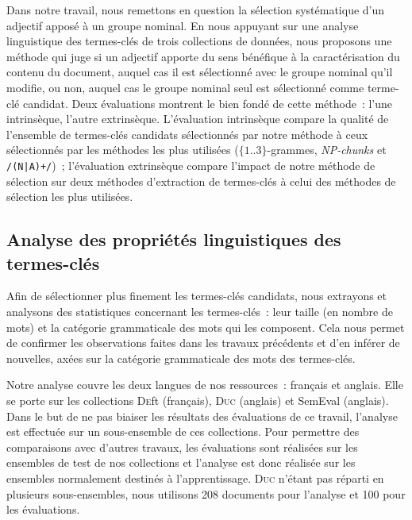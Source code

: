     Dans notre travail, nous remettons en question la sélection systématique
    d'un adjectif apposé à un groupe nominal. En nous appuyant sur une analyse
    linguistique des termes-clés de trois collections de données, nous proposons
    une méthode qui juge si un adjectif apporte du sens bénéfique à la
    caractérisation du contenu du document, auquel cas il est sélectionné avec
    le groupe nominal qu'il modifie, ou non, auquel cas le groupe nominal seul
    est sélectionné comme terme-clé candidat. Deux évaluations montrent le bien
    fondé de cette méthode~: l'une intrinsèque, l'autre extrinsèque.
    L'évaluation intrinsèque compare la qualité de l'ensemble de termes-clés
    candidats sélectionnés par notre méthode à ceux sélectionnés par les
    méthodes les plus utilisées ($\{1..3\}$-grammes, \textit{NP-chunks} et
    \texttt{/(N|A)+/})~; l'évaluation extrinsèque compare l'impact de notre
    méthode de sélection sur deux méthodes d'extraction de termes-clés à celui
    des méthodes de sélection les plus utilisées.

    \subsection{Analyse des propriétés linguistiques des termes-clés}
    \label{subsec:main:domain_independent_keyphrase_extraction-keyphrase_candidate_selection-analysis_of_keyphrase_properties}
      Afin de sélectionner plus finement les termes-clés candidats, nous
      extrayons et analysons des statistiques concernant les termes-clés~: leur
      taille (en nombre de mots) et la catégorie grammaticale des mots qui les
      composent. Cela nous permet de confirmer les observations faites dans les
      travaux précédents et d'en inférer de nouvelles, axées sur la catégorie
      grammaticale des mots des termes-clés.

      Notre analyse couvre les deux langues de nos ressources~: français et
      anglais. Elle se porte sur les collections \textsc{De}ft (français),
      \textsc{Duc} (anglais) et SemEval (anglais). Dans le but de ne pas biaiser
      les résultats des évaluations de ce travail, l'analyse est effectuée sur
      un sous-ensemble de ces collections. Pour permettre des comparaisons avec
      d'autres travaux, les évaluations sont réalisées sur les ensembles de
      test de nos collections et l'analyse est donc réalisée sur les ensembles
      normalement destinés à l'apprentissage. \textsc{Duc} n'étant pas réparti
      en plusieurs sous-ensembles, nous utilisons 208 documents pour l'analyse
      et 100 pour les évaluations.

